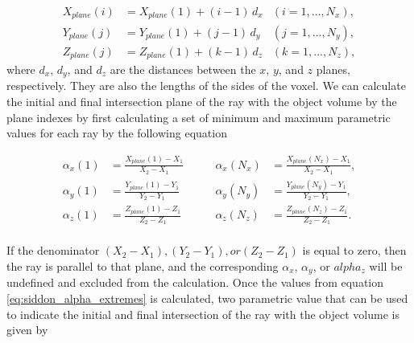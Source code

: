 \begin{equation}
	\begin{aligned}
		X_{plane}(i) & = X_{plane}(1) + (i-1)\, d_x 	&(i = 1, ..., N_x),\\ 
		Y_{plane}(j) & = Y_{plane}(1) + (j-1)\, d_y  	&(j = 1, ..., N_y),\\
		Z_{plane}(j) & = Z_{plane}(1) + (k-1)\, d_z		&(k = 1, ..., N_z),
	\end{aligned}
	\label{eq:siddon_planes}
\end{equation}
where $d_x$, $d_y$, and $d_z$ are the distances between the $x$, $y$, and $z$ planes, respectively.  They are also the lengths of the sides of the voxel.  We can calculate the initial and final intersection plane of the ray with the object volume by the plane indexes by first calculating a set of minimum and maximum parametric values for each ray by the following equation

\begin{equation}
\begin{aligned}
\alpha_x(1) &= \frac{X_{plane}(1) - X_1}{X_2 - X_1} \qquad &\alpha_x(N_x) &= \frac{X_{plane}(N_x) - X_1}{X_2 - X_1}, \\
\alpha_y(1) &= \frac{Y_{plane}(1) - Y_1}{Y_2 - Y_1} \qquad &\alpha_y(N_y) &= \frac{Y_{plane}(N_y) - Y_1}{Y_2 - Y_1}, \\
\alpha_z(1) &= \frac{Z_{plane}(1) - Z_1}{Z_2 - Z_1} \qquad &\alpha_z(N_z) &= \frac{Z_{plane}(N_z) - Z_1}{Z_2 - Z_1}. \\
\end{aligned}
\label{eq:siddon_alpha_extremes}
\end{equation}

If the denominator $(X_2 - X_1), (Y_2-Y_1), or (Z_2 - Z_1)$ is equal to zero, then the ray is parallel to that plane, and the corresponding $\alpha_x$, $\alpha_y$, or $alpha_z$ will be undefined and excluded from the calculation.  Once the values from equation \ref{eq:siddon_alpha_extremes} is calculated, two parametric value that can be used to indicate the initial and final intersection of the ray with the object volume is given by 

